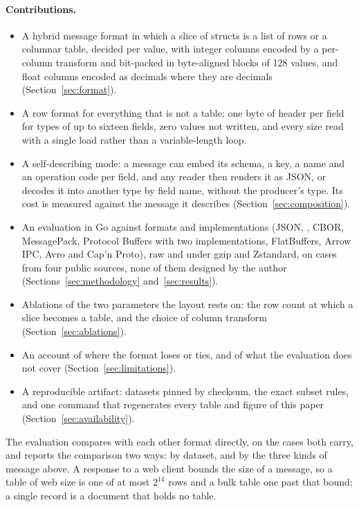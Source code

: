 \paragraph{Contributions.}
\begin{itemize}
\item A hybrid message format in which a slice of structs is a list of rows
  or a columnar table, decided per value, with integer columns encoded by a
  per-column transform and bit-packed in byte-aligned blocks of 128 values,
  and float columns encoded as decimals where they are decimals
  (Section~\ref{sec:format}).
\item A row format for everything that is not a table: one byte of header
  per field for types of up to sixteen fields, zero values not written, and
  every size read with a single load rather than a variable-length loop.
\item A self-describing mode: a message can embed its schema, a key, a name
  and an operation code per field, and any reader then renders it as JSON,
  or decodes it into another type by field name, without the producer's
  type. Its cost is measured against the message it describes
  (Section~\ref{sec:composition}).
\item An evaluation in Go against  formats and
  implementations (JSON, , CBOR, MessagePack, Protocol Buffers with two
  implementations, FlatBuffers, Arrow IPC, Avro and Cap'n Proto), raw and
  under gzip and Zstandard, on  cases from four
  public sources, none of them designed by the author
  (Sections~\ref{sec:methodology} and~\ref{sec:results}).
\item Ablations of the two parameters the layout rests on: the row count at
  which a slice becomes a table, and the choice of column transform
  (Section~\ref{sec:ablations}).
\item An account of where the format loses or ties, and of what the
  evaluation does not cover (Section~\ref{sec:limitations}).
\item A reproducible artifact: datasets pinned by checksum, the exact subset
  rules, and one command that regenerates every table and figure of this
  paper (Section~\ref{sec:availability}).
\end{itemize}

The evaluation compares \colbin{} with each other format directly, on the
cases both carry, and reports the comparison two ways: by dataset, and by
the three kinds of message above. A response to a web client bounds the
size of a message, so a table of web size is one of at most $2^{14}$ rows
and a bulk table one past that bound; a single record is a document that
holds no table.
